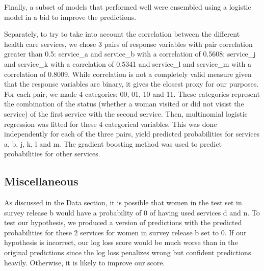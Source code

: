 \documentclass{article}\usepackage[]{graphicx}\usepackage[]{color}
\begin{document}
Finally, a subset of models that performed well were ensembled using a logistic model in a bid to improve the predictions.

Separately, to try to take into account the correlation between the different health care services, we chose 3 pairs of response variables with pair correlation greater than 0.5: service\_a and service\_b with a correlation of 0.5608; service\_j and service\_k with a correlation of 0.5341 and service\_l and service\_m with a correlation of 0.8009. While correlation is not a completely valid measure given that the response variables are binary, it gives the closest proxy for our purposes. For each pair, we made 4 categories: 00, 01, 10 and 11. These categories represent the combination of the status (whether a woman visited or did not visist the service) of the first service with the second service. Then, multinomial logistic regression was fitted for these 4 categorical variables. This was done independently for each of the three pairs, yield predicted probabilities for services a, b, j, k, l and m. The gradient boosting method was used to predict probabilities for other services.

\subsection{Miscellaneous}                                                                                                                                                                                                                                                                                                                                                                                                                                                                                                                                                                                                As discussed in the Data section, it is possible that women in the test set in survey release b would have a probability of 0 of having used services d and n. To test our hypothesis, we produced a version of predictions with the predicted probabilities for these 2 services for women in survey release b set to 0. If our hypothesis is incorrect, our log loss score would be much worse than in the original predictions since the log loss penalizes wrong but confident predictions heavily. Otherwise, it is likely to improve our score.                                                                                                                                                                                                                                                                                                                                                                                                                                                                                                                                                           
\end{document}
